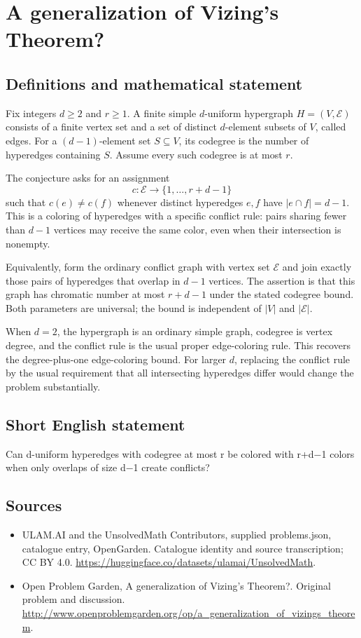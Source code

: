 \documentclass[11pt,a4paper]{article}
\begin{document}
\section*{A generalization of Vizing's Theorem?}\label{statement}

\subsection{Definitions and mathematical statement}
Fix integers $d\ge2$ and $r\ge1$. A finite simple $d$-uniform hypergraph $H=(V,\mathcal E)$ consists of a finite vertex set and a set of distinct $d$-element subsets of $V$, called edges. For a $(d-1)$-element set $S\subseteq V$, its codegree is the number of hyperedges containing $S$. Assume every such codegree is at most $r$.

The conjecture asks for an assignment
\[
 c:\mathcal E\longrightarrow\{1,\ldots,r+d-1\}
\]
such that $c(e)\ne c(f)$ whenever distinct hyperedges $e,f$ have $|e\cap f|=d-1$. This is a coloring of hyperedges with a specific conflict rule: pairs sharing fewer than $d-1$ vertices may receive the same color, even when their intersection is nonempty.

Equivalently, form the ordinary conflict graph with vertex set $\mathcal E$ and join exactly those pairs of hyperedges that overlap in $d-1$ vertices. The assertion is that this graph has chromatic number at most $r+d-1$ under the stated codegree bound. Both parameters are universal; the bound is independent of $|V|$ and $|\mathcal E|$.

When $d=2$, the hypergraph is an ordinary simple graph, codegree is vertex degree, and the conflict rule is the usual proper edge-coloring rule. This recovers the degree-plus-one edge-coloring bound. For larger $d$, replacing the conflict rule by the usual requirement that all intersecting hyperedges differ would change the problem substantially.
\subsection{Short English statement}
Can d-uniform hyperedges with codegree at most r be colored with r+d−1 colors when only overlaps of size d−1 create conflicts?
\subsection{Sources}
\begin{itemize}
\item[S1] ULAM.AI and the UnsolvedMath Contributors, supplied problems.json, catalogue entry, OpenGarden. Catalogue identity and source transcription; CC BY 4.0.
\url{https://huggingface.co/datasets/ulamai/UnsolvedMath}.
\item[S2] Open Problem Garden, A generalization of Vizing's Theorem?. Original problem and discussion.
\url{http://www.openproblemgarden.org/op/a_generalization_of_vizings_theorem}.
\end{itemize}
\end{document}
